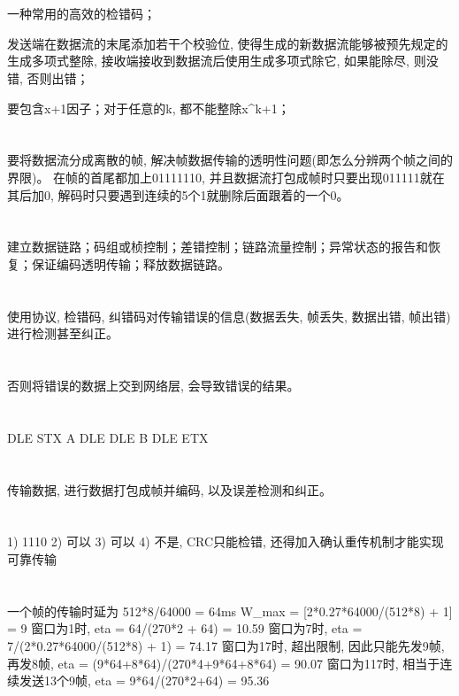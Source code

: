\documentclass{zpt}
\begin{document}
\section{}
一种常用的高效的检错码；

发送端在数据流的末尾添加若干个校验位, 使得生成的新数据流能够被预先规定的生成多项式整除, 接收端接收到数据流后使用生成多项式除它, 如果能除尽, 则没错, 否则出错；

要包含x+1因子；对于任意的k, 都不能整除x^k+1；

\section{}
要将数据流分成离散的帧, 解决帧数据传输的透明性问题(即怎么分辨两个帧之间的界限)。
在帧的首尾都加上01111110, 并且数据流打包成帧时只要出现011111就在其后加0, 解码时只要遇到连续的5个1就删除后面跟着的一个0。

\section{}
建立数据链路；码组或桢控制；差错控制；链路流量控制；异常状态的报告和恢复；保证编码透明传输；释放数据链路。
\section{}
使用协议, 检错码, 纠错码对传输错误的信息(数据丢失, 帧丢失, 数据出错, 帧出错)进行检测甚至纠正。
\section{}
否则将错误的数据上交到网络层, 会导致错误的结果。
\section{}
DLE STX A DLE DLE B DLE ETX
\section{}
传输数据, 进行数据打包成帧并编码, 以及误差检测和纠正。
\section{}
1) 1110
2) 可以
3) 可以
4) 不是, CRC只能检错, 还得加入确认重传机制才能实现可靠传输
\section{}
一个帧的传输时延为 512*8/64000 = 64ms
W_{max} = [2*0.27*64000/(512*8) + 1] = 9
窗口为1时, eta = 64/(270*2 + 64) = 10.59%
窗口为7时, eta = 7/(2*0.27*64000/(512*8) + 1) = 74.17%
窗口为17时, 超出限制, 因此只能先发9帧, 再发8帧, eta = (9*64+8*64)/(270*4+9*64+8*64) = 90.07%
窗口为117时, 相当于连续发送13个9帧, eta = 9*64/(270*2+64) = 95.36%
\end{document}
